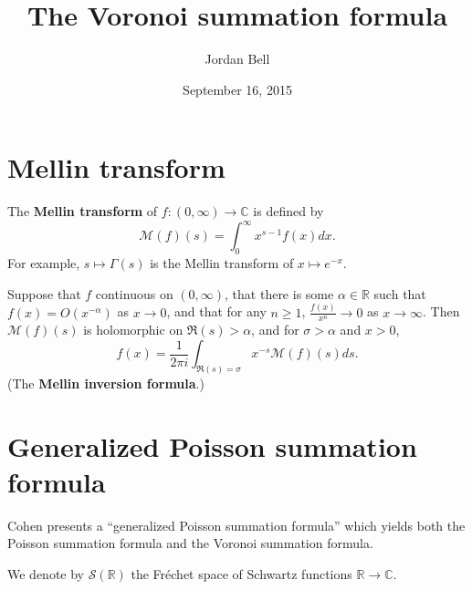 \documentclass{article}
\theoremstyle{definition}
\begin{document}
\title{The Voronoi summation formula}
\author{Jordan Bell}
\date{September 16, 2015}

\maketitle




\section{Mellin transform}
The \textbf{Mellin transform} of $f:(0,\infty) \to \mathbb{C}$ is defined by
\[
\mathscr{M}(f)(s) = \int_0^\infty x^{s-1} f(x) dx.
\]
For example, $s \mapsto \Gamma(s)$ is the Mellin transform of $x \mapsto e^{-x}$.


Suppose that $f$ continuous on $(0,\infty)$, that  there is some $\alpha \in \mathbb{R}$ such that
$f(x)=O(x^{-\alpha})$ as $x \to 0$, and that for any $n \geq 1$, $\frac{f(x)}{x^n} \to 0$ as $x \to \infty$. 
Then \cite[p.~107, Proposition 9.7.7]{cohen}
$\mathscr{M}(f)(s)$ is holomorphic on $\Re(s)>\alpha$, and
for $\sigma>\alpha$ and $x>0$,
\[
f(x)=\frac{1}{2\pi i}\int_{\Re(s)=\sigma} x^{-s} \mathscr{M}(f)(s) ds.
\] 
(The \textbf{Mellin inversion formula}.)



\section{Generalized Poisson summation formula}
Cohen \cite[pp.~177--182, \S 10.2.5]{cohen} presents a ``generalized Poisson summation formula'' which yields both the Poisson summation formula and the Voronoi
summation formula.

We denote by $\mathscr{S}(\mathbb{R})$ the Fr\'echet space of Schwartz functions $\mathbb{R} \to \mathbb{C}$.
\end{document}

